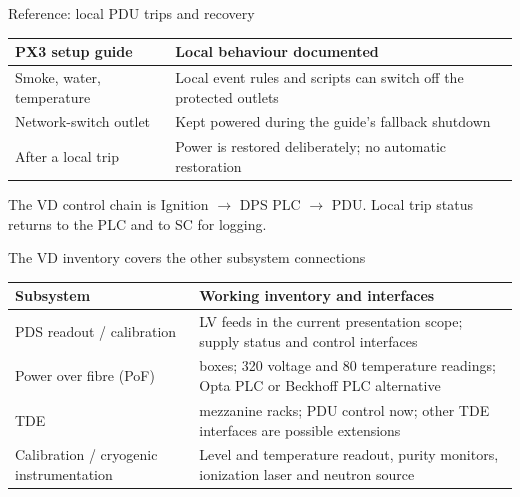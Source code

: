 \begin{frame}{Reference: local PDU trips and recovery}
  \renewcommand{\arraystretch}{1.45}
  \begin{tabularx}{\textwidth}{@{}>{\RaggedRight\arraybackslash}p{3.7cm}>{\RaggedRight\arraybackslash}X@{}}
    \toprule
    \textbf{PX3 setup guide} & \textbf{Local behaviour documented}\\
    \midrule
    Smoke, water, temperature & Local event rules and scripts can switch off the protected outlets\\
    Network-switch outlet & Kept powered during the guide's fallback shutdown\\
    After a local trip & Power is restored deliberately; no automatic restoration\\
    \bottomrule
  \end{tabularx}\par
  \bigskip
  The VD control chain is Ignition $\rightarrow$ DPS PLC $\rightarrow$ PDU.
  Local trip status returns to the PLC and to SC for logging.
\end{frame}

\begin{frame}{The VD inventory covers the other subsystem connections}
  \renewcommand{\arraystretch}{1.35}
  \begin{tabularx}{\textwidth}{@{}>{\RaggedRight\arraybackslash}p{3.2cm}>{\RaggedRight\arraybackslash}X@{}}
    \toprule
    \textbf{Subsystem} & \textbf{Working inventory and interfaces}\\
    \midrule
    PDS readout / calibration & 34 LV feeds in the current presentation scope; supply status and control interfaces\\
    Power over fibre (PoF) & 80 boxes; 320 voltage and 80 temperature readings; Opta PLC or Beckhoff PLC alternative\\
    TDE & 20 mezzanine racks; PDU control now; other TDE interfaces are possible extensions\\
    Calibration / cryogenic instrumentation & Level and temperature readout, purity monitors, ionization laser and neutron source\\
    \bottomrule
  \end{tabularx}
\end{frame}

